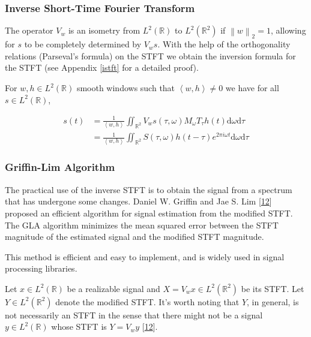 \documentclass[american,]{article}
\theoremstyle{definition}
\theoremstyle{definition}
\theoremstyle{definition}
\theoremstyle{remark}
\begin{document}
\hypertarget{inverse-short-time-fourier-transform}{%
\subsubsection{Inverse Short-Time Fourier Transform}\label{inverse-short-time-fourier-transform}}

The operator \(V_w\) is an isometry from \(L^2(\mathbb{R})\) to \(L^2(\mathbb{R}^2)\)
if \(\left\lVert w\right\rVert_2=1\),
allowing for \(s\) to be completely determined by \(V_w s\).
With the help of the orthogonality relations (Parseval's formula) on the STFT we obtain
the inversion formula for the STFT (see Appendix \ref{istft} for a detailed proof).

For \(w,h\in L^2(\mathbb{R})\) smooth windows such that \(\left\langle w,h\right\rangle\neq 0\)
we have for all \(s\in L^2(\mathbb{R})\),

\begin{align}
s(t) &=\frac{1}{\left\langle w,h\right\rangle} \iint_{\mathbb{R}^2}V_w s(\tau,\omega)M_\omega T_\tau h(t) \mathrm{d}\omega\mathrm{d}\tau\\
     &= \frac{1}{\left\langle w,h\right\rangle}
        \iint_{\mathbb{R}^2} S(\tau,\omega) h(t-\tau) e^{2\pi i\omega t} \mathrm{d}\omega\mathrm{d}\tau
\end{align}

\hypertarget{griffin-lim-algorithm}{%
\subsubsection{Griffin-Lim Algorithm}\label{griffin-lim-algorithm}}

The practical use of the inverse STFT is to obtain the signal
from a spectrum that has undergone some changes.
Daniel W. Griffin and Jae S. Lim {[}\protect\hyperlink{ref-griffin1983}{12}{]} proposed
an efficient algorithm for signal estimation from the modified STFT.
The GLA algorithm minimizes the mean squared error between the STFT magnitude
of the estimated signal and the modified STFT magnitude.

This method is efficient and easy to implement, and is widely
used in signal processing libraries.

Let \(x\in L^2(\mathbb{R})\) be a realizable signal and \(X=V_w x\in L^2(\mathbb{R}^2)\)
be its STFT. Let \(Y\in L^2(\mathbb{R}^2)\) denote the modified STFT.
It's worth noting that \(Y\), in general, is not necessarily an STFT
in the sense that there might not be a signal \(y\in L^2(\mathbb{R})\)
whose STFT is \(Y=V_w y\) {[}\protect\hyperlink{ref-griffin1983}{12}{]}.
\end{document}
